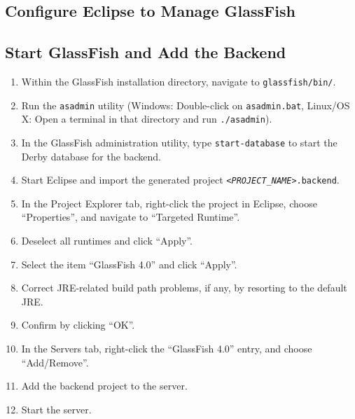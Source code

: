 
\subsection{Configure Eclipse to Manage GlassFish}



\subsection{Start GlassFish and Add the Backend}

\begin{enumerate}
\item Within the GlassFish installation directory, navigate to \texttt{glassfish/bin/}.
\item Run the \texttt{asadmin} utility (Windows: Double-click on \texttt{asadmin.bat}, Linux/OS X: Open a terminal in that directory and run \texttt{./asadmin}).
\item In the GlassFish administration utility, type \texttt{start-database} to start the Derby database for the backend.
\item Start Eclipse and import the generated project \texttt{\textit{<PROJECT\_NAME>}.backend}.
\item In the Project Explorer tab, right-click the project in Eclipse, choose \enquote{Properties}, and navigate to \enquote{Targeted Runtime}.
\item Deselect all runtimes and click \enquote{Apply}.
\item Select the item \enquote{GlassFish 4.0} and click \enquote{Apply}.
\item Correct JRE-related build path problems, if any, by resorting to the default JRE.
\item Confirm by clicking \enquote{OK}.
\item In the Servers tab, right-click the \enquote{GlassFish 4.0} entry, and choose \enquote{Add/Remove}.
\item Add the backend project to the server.
\item Start the server.
\end{enumerate}